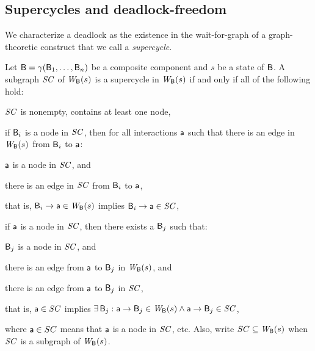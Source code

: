 \subsection{Supercycles and deadlock-freedom}

We characterize a deadlock as the existence in the wait-for-graph of a
graph-theoretic construct that we call a {\em supercycle}.

\bd[Supercycle]
\label{def:supercycle} 
\label{defn:supercycle} 
Let $\mathsf{B} = \gamma(\mathsf{B}_1,\dots,\mathsf{B}_n)$ be a composite component and $s$ be a state of $\mathsf{B}$.
A subgraph $\mathit{SC}$ of $\mathit{W}_{\mathsf{B}}({s})$ is a supercycle in $\mathit{W}_{\mathsf{B}}({s})$ if and only if all of the following hold:
\begin{nlst1}
   \item \label{def:supercycle.nonempty} \label{clause:supercycle.nonempty} 
$\mathit{SC}$ is nonempty, \ie contains at least one node,

   \item \label{def:supercycle.component-blocked} \label{clause:supercycle.component-blocked} 
if $\mathsf{B}_i$ is a node in $\mathit{SC}$, then for all interactions $\mathsf{a}$ such that
there is an edge in $\mathit{W}_{\mathsf{B}}({s})$ from $\mathsf{B}_i$ to $\mathsf{a}$:
      \begin{nlst2}
      \item $\mathsf{a}$ is a node in $\mathit{SC}$, and 
      \item there is an edge in $\mathit{SC}$ from $\mathsf{B}_i$ to $\mathsf{a}$,
      \end{nlst2}
that is, $\mathsf{B}_i \rightarrow \mathsf{a} \in \mathit{W}_{\mathsf{B}}({s})$ implies $\mathsf{B}_i \rightarrow \mathsf{a} \in \mathit{SC}$,

   \item \label{def:supercycle.action-blocked}  \label{clause:supercycle.action-blocked}  
if $\mathsf{a}$ is a node in $\mathit{SC}$, then there exists a $\mathsf{B}_j$ such that:
      \begin{nlst2}
      \item $\mathsf{B}_j$  is a node in $\mathit{SC}$, and
      \item there is an edge from $\mathsf{a}$ to $\mathsf{B}_j$ in $\mathit{W}_{\mathsf{B}}({s})$, and
      \item there is an edge from $\mathsf{a}$ to $\mathsf{B}_j$ in $\mathit{SC}$,
      \end{nlst2}
that is, $\mathsf{a} \in \mathit{SC}$ implies $\exists\, \mathsf{B}_j : \mathsf{a} \rightarrow \mathsf{B}_j \in \mathit{W}_{\mathsf{B}}({s}) \land \mathsf{a} \rightarrow \mathsf{B}_j \in \mathit{SC}$,

\end{nlst1}
\ed
where $\mathsf{a} \in SC$ means that $\mathsf{a}$ is a node in $\mathit{SC}$, etc. 
Also, write $SC \subseteq \mathit{W}_{\mathsf{B}}({s})$ when $\mathit{SC}$ is a subgraph of $\mathit{W}_{\mathsf{B}}({s})$.


